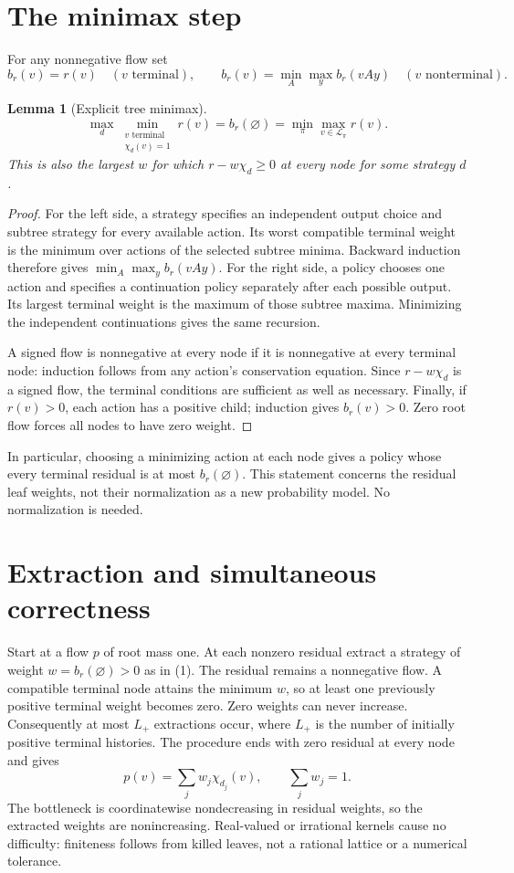 \documentclass[11pt,a4paper]{article}
\newtheorem{lemma}{Lemma}
\begin{document}
\section{The minimax step}
For any nonnegative flow set
\[
b_r(v)=r(v)\quad(v\text{ terminal}),\qquad
b_r(v)=\min_A\max_y b_r(vAy)\quad(v\text{ nonterminal}).
\]
\begin{lemma}[Explicit tree minimax]
\[
\max_d\min_{\substack{v\text{ terminal}\\\chi_d(v)=1}}r(v)
=b_r(\varnothing)
=\min_\pi\max_{v\in\mathcal L_\pi}r(v).
\tag{1}
\]
This is also the largest $w$ for which $r-w\chi_d\ge0$ at every node for
some strategy $d$.
\end{lemma}
\begin{proof}
For the left side, a strategy specifies an independent output choice and
subtree strategy for every available action. Its worst compatible terminal
weight is the minimum over actions of the selected subtree minima.
Backward induction therefore gives $\min_A\max_y b_r(vAy)$.
For the right side, a policy chooses one action and specifies a continuation
policy separately after each possible output. Its largest terminal weight
is the maximum of those subtree maxima. Minimizing the independent
continuations gives the same recursion.

A signed flow is nonnegative at every node if it is nonnegative at every
terminal node: induction follows from any action's conservation equation.
Since $r-w\chi_d$ is a signed flow, the terminal conditions are sufficient
as well as necessary. Finally, if $r(v)>0$, each action has a positive
child; induction gives $b_r(v)>0$. Zero root flow forces all nodes to have
zero weight.
\end{proof}
In particular, choosing a minimizing action at each node gives a policy
whose every terminal residual is at most $b_r(\varnothing)$. This statement
concerns the residual leaf weights, not their normalization as a new
probability model. No normalization is needed.

\section{Extraction and simultaneous correctness}
Start at a flow $p$ of root mass one. At each nonzero residual extract a
strategy of weight $w=b_r(\varnothing)>0$ as in (1). The residual remains
a nonnegative flow. A compatible terminal node attains the minimum $w$,
so at least one previously positive terminal weight becomes zero. Zero
weights can never increase. Consequently at most $L_+$ extractions occur,
where $L_+$ is the number of initially positive terminal histories.
The procedure ends with zero residual at every node and gives
\[
p(v)=\sum_jw_j\chi_{d_j}(v),\qquad \sum_jw_j=1.
\tag{2}
\]
The bottleneck is coordinatewise nondecreasing in residual weights, so the
extracted weights are nonincreasing. Real-valued or irrational kernels
cause no difficulty: finiteness follows from killed leaves, not a rational
lattice or a numerical tolerance.
\end{document}
